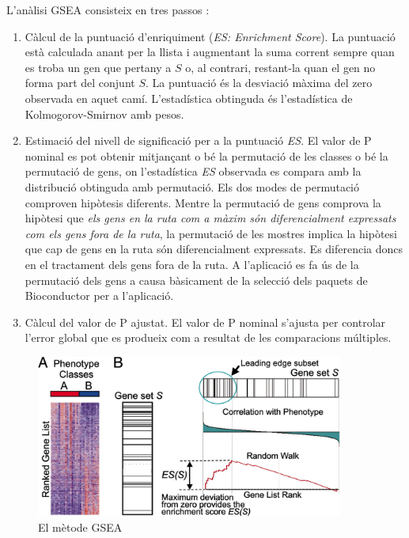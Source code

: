 L'anàlisi \gls{GSEA} consisteix en tres passos \cite{subramanian2005gene}:

\begin{enumerate}
\item Càlcul de la puntuació d’enriquiment (\textit{\gls{ES}: Enrichment Score}). La puntuació està calculada anant per la llista i augmentant la suma corrent sempre quan es troba un gen que pertany a $S$ o, al contrari, restant-la quan el gen no forma part del conjunt $S$. La puntuació és la desviació màxima del zero observada en aquet camí. L'estadística obtinguda és l’estadística de Kolmogorov-Smirnov amb pesos.

\item Estimació del nivell de significació per a la puntuació \textit{\gls{ES}}. El valor de P nominal es pot obtenir mitjançant o bé la permutació de les classes o bé la permutació de gens, on l'estadística \textit{\gls{ES}} observada es compara amb la distribució obtinguda amb permutació. Els dos modes de permutació comproven hipòtesis diferents. Mentre la permutació de gens comprova la hipòtesi que \textit{els gens en la ruta com a màxim són diferencialment expressats com els gens fora de la ruta},
la permutació de les mostres implica la hipòtesi que cap de gens en la ruta són diferencialment expressats. Es diferencia doncs en el tractament dels gens fora de la ruta. A l'aplicació es fa ús de la permutació dels gens a causa bàsicament de la selecció dels paquets de \gls{Bioconductor} per a l’aplicació.


\item Càlcul del valor de P ajustat. El valor de P nominal s'ajusta per controlar l'error global que es produeix com a resultat de les comparacions múltiples.
\end{enumerate}

\begin{figure}[H]
\centering
\includegraphics[width=0.9\textwidth]{figures/GSEA_Method.jpg} 
\caption{El mètode \gls{GSEA}}
\end{figure}

